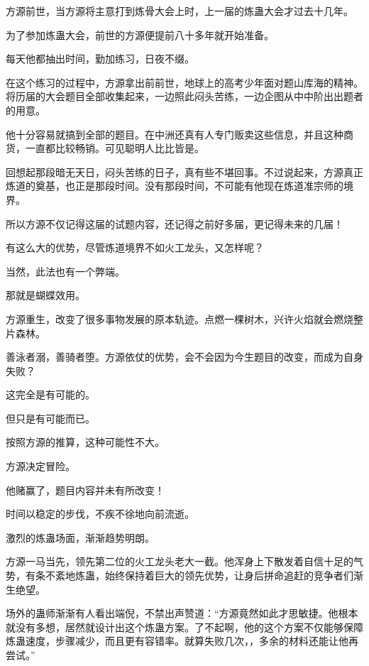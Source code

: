 
\begin{this_body}



方源前世，当方源将主意打到炼骨大会上时，上一届的炼蛊大会才过去十几年。

为了参加炼蛊大会，前世的方源便提前八十多年就开始准备。

每天他都抽出时间，勤加练习，日夜不缀。

在这个练习的过程中，方源拿出前前世，地球上的高考少年面对题山库海的精神。将历届的大会题目全部收集起来，一边照此闷头苦练，一边企图从中中阶出出题者的用意。

他十分容易就搞到全部的题目。在中洲还真有人专门贩卖这些信息，并且这种商货，一直都比较畅销。可见聪明人比比皆是。

回想起那段暗无天日，闷头苦练的日子，真有些不堪回事。不过说起来，方源真正炼道的奠基，也正是那段时间。没有那段时间，不可能有他现在炼道准宗师的境界。

所以方源不仅记得这届的试题内容，还记得之前好多届，更记得未来的几届！

有这么大的优势，尽管炼道境界不如火工龙头，又怎样呢？

当然，此法也有一个弊端。

那就是蝴蝶效用。

方源重生，改变了很多事物发展的原本轨迹。点燃一棵树木，兴许火焰就会燃烧整片森林。

善泳者溺，善骑者堕。方源依仗的优势，会不会因为今生题目的改变，而成为自身失败？

这完全是有可能的。

但只是有可能而已。

按照方源的推算，这种可能性不大。

方源决定冒险。

他赌赢了，题目内容并未有所改变！

时间以稳定的步伐，不疾不徐地向前流逝。

激烈的炼蛊场面，渐渐趋势明朗。

方源一马当先，领先第二位的火工龙头老大一截。他浑身上下散发着自信十足的气势，有条不紊地炼蛊，始终保持着巨大的领先优势，让身后拼命追赶的竞争者们渐生绝望。

场外的蛊师渐渐有人看出端倪，不禁出声赞道：“方源竟然如此才思敏捷。他根本就没有多想，居然就设计出这个炼蛊方案。了不起啊，他的这个方案不仅能够保障炼蛊速度，步骤减少，而且更有容错率。就算失败几次，，多余的材料还能让他再尝试。”


\end{this_body}
